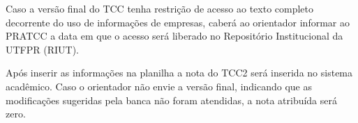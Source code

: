 \documentclass[a4paper, 12pt]{article}
\begin{document}
	Caso a versão final do TCC tenha restrição de acesso ao texto completo decorrente do uso de informações de empresas, caberá ao orientador informar ao PRATCC a data em que o acesso será liberado no Repositório Institucional da UTFPR (RIUT).
		
	Após inserir as informações na planilha a nota do TCC2 será inserida no sistema acadêmico. Caso o orientador não envie a versão final, indicando que as modificações sugeridas pela banca não foram atendidas, a nota atribuída será zero.
\end{document}
